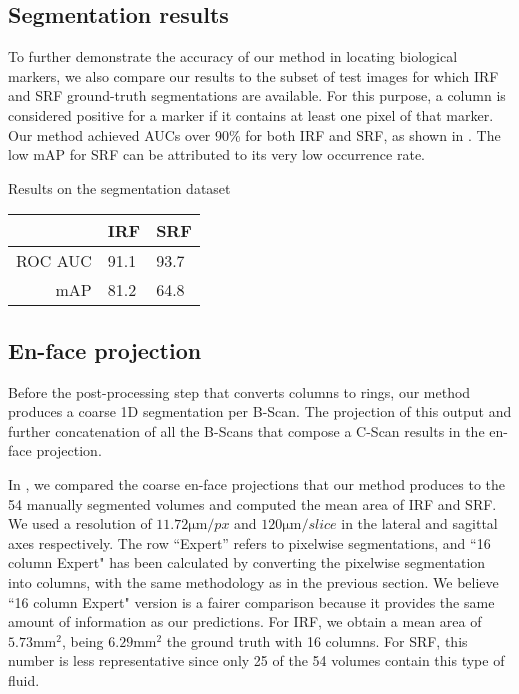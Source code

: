 \subsection{Segmentation results}

To further demonstrate the accuracy of our method in locating biological markers, we also compare our results to the subset of test images for which IRF and SRF ground-truth segmentations are available. For this purpose, a column is considered positive for a marker if it contains at least one pixel of that marker. Our method achieved AUCs over 90\% for both IRF and SRF, as shown in . The low mAP for SRF can be attributed to its very low occurrence rate.

\begin{margintable}[]\small
\caption{Results on the segmentation dataset}
\label{tab:segmentation_results}
\begin{tabular}{@{}rll@{}}
\toprule
 & \textbf{IRF} & \textbf{SRF} \\ \midrule
ROC AUC & 91.1 & 93.7 \\
mAP & 81.2 & 64.8 \\ \bottomrule
\end{tabular}
\end{margintable}

\subsection{En-face projection}

Before the post-processing step that converts columns to rings, our method produces a coarse 1D segmentation per B-Scan. The projection of this output and further concatenation of all the B-Scans that compose a C-Scan results in the en-face projection.

In , we compared the coarse en-face projections that our method produces to the 54 manually segmented volumes and computed the mean area of IRF and SRF. We used a resolution of $11.72 \si{\micro\meter\per px}$ and $120 \si{\micro\meter\per slice}$ in the lateral and sagittal axes respectively. The row “Expert” refers to pixelwise segmentations, and ``16 column Expert" has been calculated by converting the pixelwise segmentation into columns, with the same methodology as in the previous section. We believe ``16 column Expert" version is a fairer comparison because it provides the same amount of information as our predictions. For IRF, we obtain a mean area of $5.73 \si{\milli\meter^2}$, being $6.29 \si{\milli\meter^2}$ the ground truth with 16 columns. For SRF, this number is less representative since only 25 of the 54 volumes contain this type of fluid.

